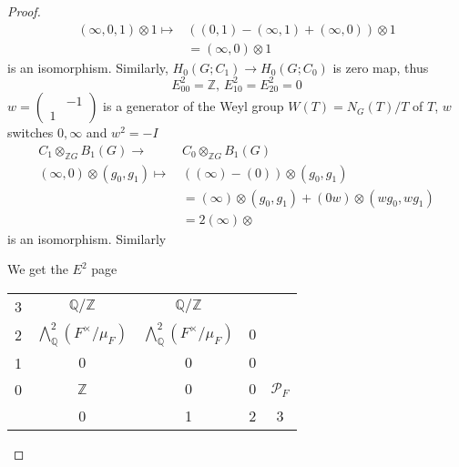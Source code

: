 \documentclass[../main.tex]{subfiles}
\begin{document}
\begin{proof}
\begin{align*}
(\infty,0,1)\otimes1\mapsto& ((0,1)-(\infty,1)+(\infty,0))\otimes1 \\
&=(\infty,0)\otimes1
\end{align*}
is an isomorphism. Similarly, $H_0(G;C_1)\to H_0(G;C_0)$ is zero map, thus
\[E^2_{00}=\mathbb Z,\,E^2_{10}=E^2_{20}=0\]
$w=\begin{pmatrix}
&-1 \\
1&
\end{pmatrix}$ is a generator of the Weyl group $W(T)=N_G(T)/T$ of $T$, $w$ switches $0,\infty$ and $w^2=-I$
\begin{align*}
C_1\otimes_{\mathbb ZG}B_1(G)\to\,&C_0\otimes_{\mathbb ZG}B_1(G) \\
(\infty,0)\otimes(g_0,g_1)\mapsto\,& ((\infty)-(0))\otimes(g_0,g_1) \\
&=(\infty)\otimes(g_0,g_1)+(0w)\otimes(wg_0,wg_1) \\
&=2(\infty)\otimes 
\end{align*}
is an isomorphism. Similarly

We get the $E^2$ page
\begin{center}
\begin{tabular}{c|cccc}
3&$\mathbb Q/\mathbb Z$&$\mathbb Q/\mathbb Z$&& \\
2&$\bigwedge^2_{\mathbb Q}(F^\times/\mu_{F})$&$\bigwedge^2_{\mathbb Q}(F^\times/\mu_{F})$&$0$& \\
1&$0$&$0$&$0$& \\
0&$\mathbb Z$&$0$&$0$&$\mathcal P_F$ \\
\hline
&0&1&2&3
\end{tabular}
\end{center}
\end{proof}
\end{document}
